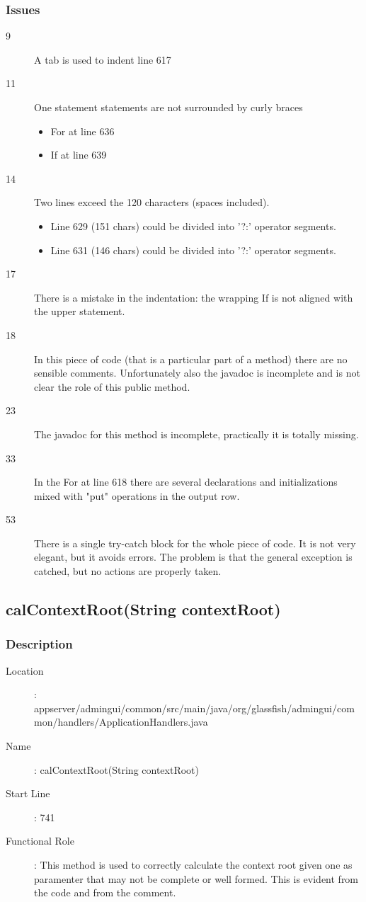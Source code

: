 		\subsubsection{Issues}
		\begin{description}
			\item[9] A tab is used to indent line 617
			\item[11] One statement statements are not surrounded by curly braces
			\begin{itemize}
				\item For at line 636
				\item If at line 639
			\end{itemize}
			\item[14] Two lines exceed the 120 characters (spaces included).
			\begin{itemize}
				\item Line 629 (151 chars) could be divided into '?:' operator segments.
				\item Line 631 (146 chars) could be divided into '?:' operator segments.
			\end{itemize}
			\item[17] There is a mistake in the indentation: the wrapping If is not aligned with the upper statement.
			\item[18] In this piece of code (that is a particular part of a method) there are no sensible comments.
			Unfortunately also the javadoc is incomplete and is not clear the role of this public method.
			\item[23] The javadoc for this method is incomplete, practically it is totally missing.
			\item[33] In the For at line 618 there are several declarations and initializations mixed with "put"
			operations in the output row.
			\item[53] There is a single try-catch block for the whole piece of code. It is not very elegant, but
			it avoids errors. The problem is that the general exception is catched, but no actions are properly taken.
		\end{description}
		\clearpage
		\subsection{calContextRoot(String contextRoot)}
			\subsubsection{Description}
			\begin{description}
			\item[Location]: appserver/admingui/common/src/main/java/org/glassfish/admingui/common/handlers/ApplicationHandlers.java
			\item[Name]: calContextRoot(String contextRoot)
			\item[Start Line]: 741
			\item[Functional Role]: This method is used to correctly calculate the context root given one as paramenter that may not be complete or well formed. This is evident
			from the code and from the comment.
			\end{description}
